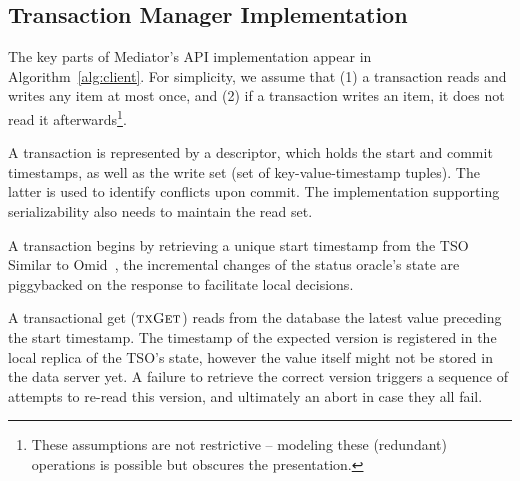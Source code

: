 \subsection{Transaction Manager Implementation}
\label{sec:si:client}

The key parts of Mediator's API implementation appear in Algorithm~\ref{alg:client}. 
For simplicity, we assume that (1) a transaction reads and writes any item 
at most once, and (2) if a transaction writes an item, it does not read it
afterwards\footnote{These assumptions are not restrictive -- modeling these
(redundant) operations is possible but obscures the presentation.}. 


A transaction 
is represented by a descriptor, which holds the start and commit timestamps, 
as well as the write set (set of key-value-timestamp tuples). The latter is 
used to identify conflicts upon commit. 
The implementation supporting serializability also needs to maintain the read
set.

A transaction begins by retrieving a unique start timestamp from the 
TSO Similar to Omid~\cite{Omid2014}, the incremental
changes of the status oracle's state are piggybacked on the response to facilitate local decisions. 

A transactional get ($\textsc{txGet}$) reads from the database the latest value 
preceding the start timestamp.
The timestamp of the expected version is registered in the local 
replica of the TSO's state, however the value
itself might not be stored in the data server yet. A failure to retrieve the
correct version triggers a sequence of attempts to re-read this version, and ultimately an abort in case they all fail.

